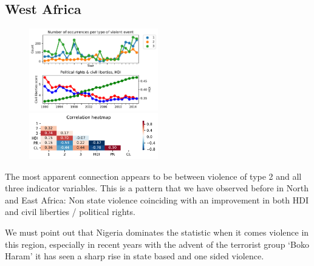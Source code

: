 \documentclass[a4paper,11pt]{article}
\begin{document}
\subsection{West Africa}
\begin{figure}[ht!]
    \includegraphics[width=0.50\textwidth]{images/wa.pdf}
    \includegraphics[width=0.50\textwidth]{images/wa_corr.pdf}
\end{figure}
The most apparent connection appears to be between violence of type 2 and all three indicator variables. This is a pattern that we have observed before in North and East Africa: Non state violence coinciding with an improvement in both HDI and civil liberties / political rights. 

We must point out that Nigeria dominates the statistic when it comes violence in this region, especially in recent years with the advent of the terrorist group `Boko Haram' it has seen a sharp rise in state based and one sided violence.
\end{document}
